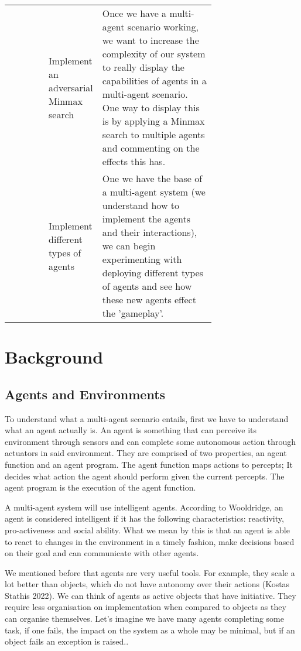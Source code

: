 \documentclass[]{final_report}
\begin{document}
\begin{center}
\begin{tabular}{||c|M{0.15\linewidth}|m{0.55\linewidth}||}
   & Implement an adversarial Minmax search & Once we have a multi-agent scenario working, we want to increase the complexity of our system to really display the capabilities of agents in a multi-agent scenario. One way to display this is by applying a Minmax search to multiple agents and commenting on the effects this has. \\
   
   & Implement different types of agents & One we have the base of a multi-agent system (we understand how to implement the agents and their interactions), we can begin experimenting with deploying different types of agents and see how these new agents effect the 'gameplay'.\\
   \hline
\end{tabular}
\end{center}

\newpage
\chapter{Background}
\section{Agents and Environments}\label{Agents and Environments}

To understand what a multi-agent scenario entails, first we have to understand what an agent actually is. An agent is something that can perceive its environment through sensors and can complete some autonomous action through actuators in said environment. They are comprised of two properties, an agent function and an agent program. The agent function maps actions to percepts; It decides what action the agent should perform given the current percepts. The agent program is the execution of the agent function. 

A multi-agent system will use intelligent agents. According to Wooldridge\cite{WooldridgeMichael2009AitM}, an agent is considered intelligent if it has the following characteristics: reactivity, pro-activeness and social ability. What we mean by this is that an agent is able to react to changes in the environment in a timely fashion, make decisions based on their goal and can communicate with other agents.

We mentioned before that agents are very useful tools. For example, they scale a lot better than objects, which do not have autonomy over their actions (Kostas Stathis 2022). We can think of agents as active objects that have initiative. They require less organisation on implementation when compared to objects as they can organise themselves. Let's imagine we have many agents completing some task, if one fails, the impact on the system as a whole may be minimal, but if an object fails an exception is raised.\cite{odell2002objects}.
\end{document}
